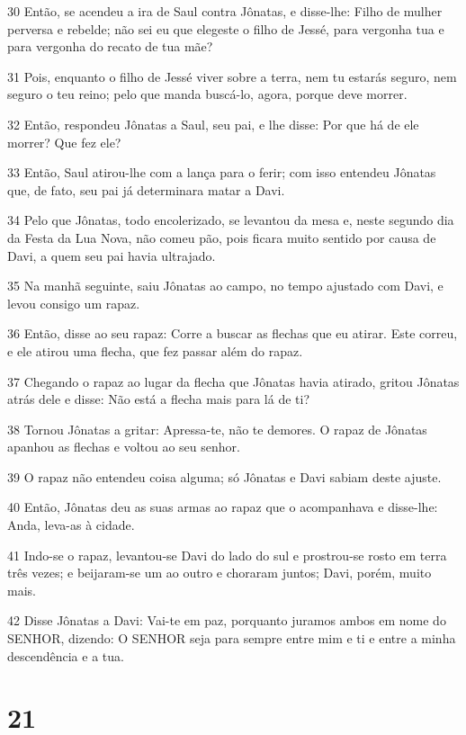 \par 30 Então, se acendeu a ira de Saul contra Jônatas, e disse-lhe: Filho de mulher perversa e rebelde; não sei eu que elegeste o filho de Jessé, para vergonha tua e para vergonha do recato de tua mãe?
\par 31 Pois, enquanto o filho de Jessé viver sobre a terra, nem tu estarás seguro, nem seguro o teu reino; pelo que manda buscá-lo, agora, porque deve morrer.
\par 32 Então, respondeu Jônatas a Saul, seu pai, e lhe disse: Por que há de ele morrer? Que fez ele?
\par 33 Então, Saul atirou-lhe com a lança para o ferir; com isso entendeu Jônatas que, de fato, seu pai já determinara matar a Davi.
\par 34 Pelo que Jônatas, todo encolerizado, se levantou da mesa e, neste segundo dia da Festa da Lua Nova, não comeu pão, pois ficara muito sentido por causa de Davi, a quem seu pai havia ultrajado.
\par 35 Na manhã seguinte, saiu Jônatas ao campo, no tempo ajustado com Davi, e levou consigo um rapaz.
\par 36 Então, disse ao seu rapaz: Corre a buscar as flechas que eu atirar. Este correu, e ele atirou uma flecha, que fez passar além do rapaz.
\par 37 Chegando o rapaz ao lugar da flecha que Jônatas havia atirado, gritou Jônatas atrás dele e disse: Não está a flecha mais para lá de ti?
\par 38 Tornou Jônatas a gritar: Apressa-te, não te demores. O rapaz de Jônatas apanhou as flechas e voltou ao seu senhor.
\par 39 O rapaz não entendeu coisa alguma; só Jônatas e Davi sabiam deste ajuste.
\par 40 Então, Jônatas deu as suas armas ao rapaz que o acompanhava e disse-lhe: Anda, leva-as à cidade.
\par 41 Indo-se o rapaz, levantou-se Davi do lado do sul e prostrou-se rosto em terra três vezes; e beijaram-se um ao outro e choraram juntos; Davi, porém, muito mais.
\par 42 Disse Jônatas a Davi: Vai-te em paz, porquanto juramos ambos em nome do SENHOR, dizendo: O SENHOR seja para sempre entre mim e ti e entre a minha descendência e a tua.

\chapter{21}

